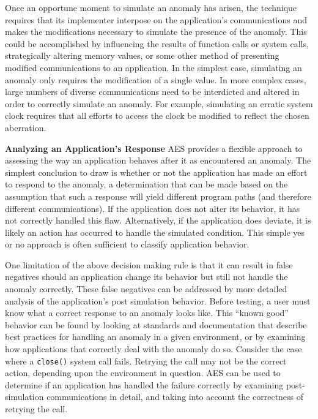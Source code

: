 Once an opportune moment to simulate an anomaly has arisen,
the technique requires that its implementer
interpose on the application's communications
and makes the modifications necessary
to simulate the presence
of the anomaly.
This could be accomplished by
influencing the results of function calls or system calls,
strategically altering memory values,
or some other method
of presenting modified communications to an application.
In the simplest case,
simulating an anomaly only requires
the modification of a single value.
In more complex cases,
large numbers of diverse communications
need to be interdicted and altered
in order to correctly simulate an anomaly.
For example,
simulating an erratic system clock
requires that all efforts
to access the clock
be modified to reflect the chosen aberration.

\textbf{Analyzing an Application's Response}
AES provides a flexible approach to assessing the way an application
behaves after it as encountered an anomaly.
The simplest conclusion to draw
is whether or not the application
has made an effort to respond
to the anomaly,
a determination that can be made based
on the assumption
that such a response will yield
different program paths (and therefore different communications).
If the application
does not alter its behavior, it has not
correctly handled this flaw.
Alternatively,
if the application does deviate,
it is likely
an action has occurred to handle the simulated condition.
This simple yes or no approach
is often sufficient
to classify application behavior.

One limitation of the above decision making rule
is that it can result in false negatives
should an application change its behavior
but still not handle the anomaly correctly.
These false negatives can be addressed
by more detailed analysis
of the application's post simulation behavior.
Before testing,
a user must know
what a correct response
to an anomaly looks like.
This ``known good'' behavior can be found
by looking at standards and documentation
that describe best practices for handling an anomaly
in a given environment,
or by examining how applications that correctly
deal with the anomaly do so.
Consider the case where a {\tt close()} system call fails.
Retrying the call may not be the correct action,
depending upon the environment in question.
AES can be used to determine if an application
has handled the failure correctly
by examining post-simulation communications in detail,
and taking into account the correctness of retrying the call.


